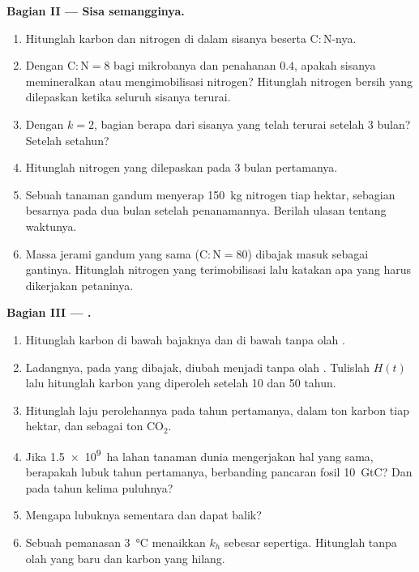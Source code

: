\begin{problem}
\medskip
\noindent\textbf{Bagian II --- Sisa semangginya.}
\begin{enumerate}[resume]
  \item Hitunglah karbon dan nitrogen di dalam sisanya beserta
        $\mathrm{C:N}$-nya.
  \item Dengan $\mathrm{C:N} = 8$ bagi mikrobanya dan penahanan $0.4$,
        apakah sisanya memineralkan atau mengimobilisasi nitrogen?
        Hitunglah nitrogen bersih yang dilepaskan ketika seluruh
        sisanya terurai.
  \item Dengan $k = 2$, bagian berapa dari sisanya yang telah terurai
        setelah 3 bulan? Setelah setahun?
  \item Hitunglah nitrogen yang dilepaskan pada 3 bulan pertamanya.
  \item Sebuah tanaman gandum menyerap \qty{150}{kg} nitrogen tiap
        hektar, sebagian besarnya pada dua bulan setelah penanamannya.
        Berilah ulasan tentang waktunya.
  \item Massa jerami gandum yang sama ($\mathrm{C:N} = 80$) dibajak
        masuk sebagai gantinya. Hitunglah nitrogen yang terimobilisasi
        lalu katakan apa yang harus dikerjakan petaninya.
\end{enumerate}

\medskip
\noindent\textbf{Bagian III --- .}
\begin{enumerate}[resume]
  \item Hitunglah karbon   di bawah bajaknya dan
        di bawah tanpa olah .
  \item Ladangnya, pada  yang dibajak, diubah menjadi
        tanpa olah . Tulislah $H(t)$ lalu hitunglah karbon yang
        diperoleh setelah 10 dan 50 tahun.
  \item Hitunglah laju perolehannya pada tahun pertamanya, dalam ton
        karbon tiap hektar, dan sebagai ton $\mathrm{CO_2}$.
  \item Jika \qty{1.5e9}{ha} lahan tanaman dunia mengerjakan hal yang
        sama, berapakah lubuk tahun pertamanya, berbanding pancaran
        fosil \qty{10}{GtC}? Dan pada tahun kelima puluhnya?
  \item Mengapa lubuknya sementara dan dapat balik?
  \item Sebuah pemanasan \qty{3}{\celsius} menaikkan $k_h$ sebesar
        sepertiga. Hitunglah  tanpa olah  yang
        baru dan karbon yang hilang.
\end{enumerate}


\end{problem}
